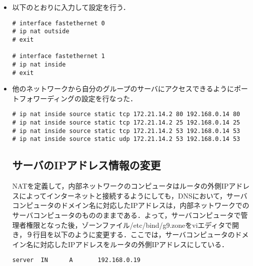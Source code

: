 \documentclass[a4j,titlepage]{jarticle}
\begin{document}
\begin{itemize}
\begin{itemize}
\item 以下のとおりに入力して設定を行う．
  
   \begin{screen}
    \begin{center}
\begin{verbatim}
# interface fastethernet 0
# ip nat outside
# exit

# interface fastethernet 1
# ip nat inside
# exit
\end{verbatim}
    \end{center}
   \end{screen}

   \item 他のネットワークから自分のグループのサーバにアクセスできるようにポートフォワーディングの設定を行なった．

    \begin{screen}
    \begin{center}
\begin{verbatim}
# ip nat inside source static tcp 172.21.14.2 80 192.168.0.14 80
# ip nat inside source static tcp 172.21.14.2 25 192.168.0.14 25
# ip nat inside source static tcp 172.21.14.2 53 192.168.0.14 53
# ip nat inside source static udp 172.21.14.2 53 192.168.0.14 53
\end{verbatim}
    \end{center}
    \end{screen}

\subsection{サーバのIPアドレス情報の変更}
NATを定義して，内部ネットワークのコンピュータはルータの外側IPアドレスによってインターネットと接続するようにしても，DNSにおいて，サーバコンピュータのドメイン名に対応したIPアドレスは，内部ネットワークでのサーバコンピュータのもののままである．よって，サーバコンピュータで管理者権限となった後，ゾーンファイル/etc/bind/g9.zoneをviエディタで開き，９行目を以下のように変更する．ここでは，サーバコンピュータのドメイン名に対応したIPアドレスをルータの外側IPアドレスにしている．
\begin{screen}
\begin{center}
\begin{verbatim}
server  IN      A       192.168.0.19
\end{verbatim}
\end{center}
\end{screen}



\end{itemize}
\end{itemize}
\end{document}
